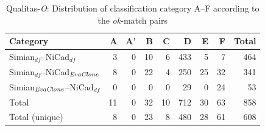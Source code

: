 \documentclass{sig-alternate-05-2015}
\begin{document}
\begin{table}
	\centering
	\caption{Qualitas-\textit{O}: Distribution of classification category A--F  according to the \textit{ok}-match pairs}
	\label{tab:ok_classification}
	\small
	\begin{tabular}{|l|r|r|r|r|r|r|r|r|}
		\hline 
		Category   																										& A   	& 	A' 	& 	B  & C	   & D   	&	E   &	F   & Total  \\
		\hline
		Simian$_{df}$--NiCad$_{df}$        & 3 	& 0 	& 10	& 6 	& 433  & 5	& 7  &  464 \\
		Simian$_{df}$--NiCad$_{\textrm{\textit{EvaClone}}}$   									& 8 	& 0 	& 22	& 4	& 250 & 25  & 32 &  341 \\
		Simian$_{\textrm{\textit{EvaClone}}}$--NiCad$_{df}$   									& 0 	& 0 	& 0 	& 0 	 & 29 	  & 0 		& 24 	& 53 \\
		\hline
		Total   &   11  &   0   &  32   &  10   &   712   &   30   & 63  & 858 \\
		Total (unique)  &   8  &   0   &  23   &  8   &  480  &  28  & 61  & 608 \\
		\hline
	\end{tabular} 
\end{table}

%
\end{document}
